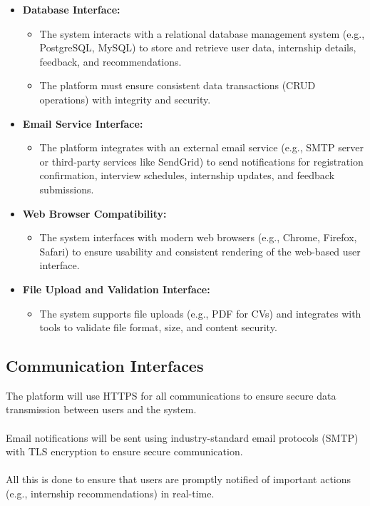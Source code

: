 \begin{itemize}
    \item \textbf{Database Interface:}
    \begin{itemize}
        \item The system interacts with a relational database management system (e.g., PostgreSQL, MySQL) to store and retrieve user data, internship details, feedback, and recommendations.
        \item The platform must ensure consistent data transactions (CRUD operations) with integrity and security.
    \end{itemize}

    \item \textbf{Email Service Interface:}
    \begin{itemize}
        \item The platform integrates with an external email service (e.g., SMTP server or third-party services like SendGrid) to send notifications for registration confirmation, interview schedules, internship updates, and feedback submissions.
    \end{itemize}

    \item \textbf{Web Browser Compatibility:}
    \begin{itemize}
        \item The system interfaces with modern web browsers (e.g., Chrome, Firefox, Safari) to ensure usability and consistent rendering of the web-based user interface.
    \end{itemize}

    \item \textbf{File Upload and Validation Interface:}
    \begin{itemize}
        \item The system supports file uploads (e.g., PDF for CVs) and integrates with tools to validate file format, size, and content security.
    \end{itemize}
\end{itemize}


\subsection{Communication Interfaces}

The platform will use HTTPS for all communications to ensure secure data transmission between users and the system.\\ \\
Email notifications will be sent using industry-standard email protocols (SMTP) with TLS encryption to ensure secure communication. \\ \\
All this is done to ensure that users are promptly notified of important actions (e.g., internship recommendations) in real-time.
\newpage

